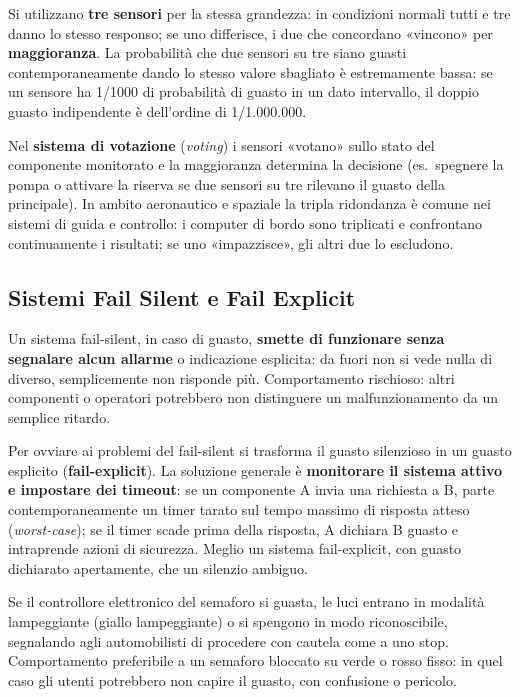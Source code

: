 \begin{defn}
Si utilizzano \textbf{tre sensori} per la stessa grandezza: in condizioni normali tutti e tre danno lo stesso responso; se uno differisce, i due che concordano «vincono» per \textbf{maggioranza}. La probabilità che due sensori su tre siano guasti contemporaneamente dando lo stesso valore sbagliato è estremamente bassa: se un sensore ha 1/1000 di probabilità di guasto in un dato intervallo, il doppio guasto indipendente è dell'ordine di 1/1.000.000.
\end{defn}

Nel \textbf{sistema di votazione} (\emph{voting}) i sensori «votano» sullo stato del componente monitorato e la maggioranza determina la decisione (es.\ spegnere la pompa o attivare la riserva se due sensori su tre rilevano il guasto della principale). In ambito aeronautico e spaziale la tripla ridondanza è comune nei sistemi di guida e controllo: i computer di bordo sono triplicati e confrontano continuamente i risultati; se uno «impazzisce», gli altri due lo escludono.

\subsection{Sistemi Fail Silent e Fail Explicit}
\begin{defn}
Un sistema fail-silent, in caso di guasto, \textbf{smette di funzionare senza segnalare alcun allarme} o indicazione esplicita: da fuori non si vede nulla di diverso, semplicemente non risponde più. Comportamento rischioso: altri componenti o operatori potrebbero non distinguere un malfunzionamento da un semplice ritardo.
\end{defn}

Per ovviare ai problemi del fail-silent si trasforma il guasto silenzioso in un guasto esplicito (\textbf{fail-explicit}). La soluzione generale è \textbf{monitorare il sistema attivo e impostare dei timeout}: se un componente A invia una richiesta a B, parte contemporaneamente un timer tarato sul tempo massimo di risposta atteso (\emph{worst-case}); se il timer scade prima della risposta, A dichiara B guasto e intraprende azioni di sicurezza. Meglio un sistema fail-explicit, con guasto dichiarato apertamente, che un silenzio ambiguo.

\begin{ex}
Se il controllore elettronico del semaforo si guasta, le luci entrano in modalità lampeggiante (giallo lampeggiante) o si spengono in modo riconoscibile, segnalando agli automobilisti di procedere con cautela come a uno stop. Comportamento preferibile a un semaforo bloccato su verde o rosso fisso: in quel caso gli utenti potrebbero non capire il guasto, con confusione o pericolo.
\end{ex}

